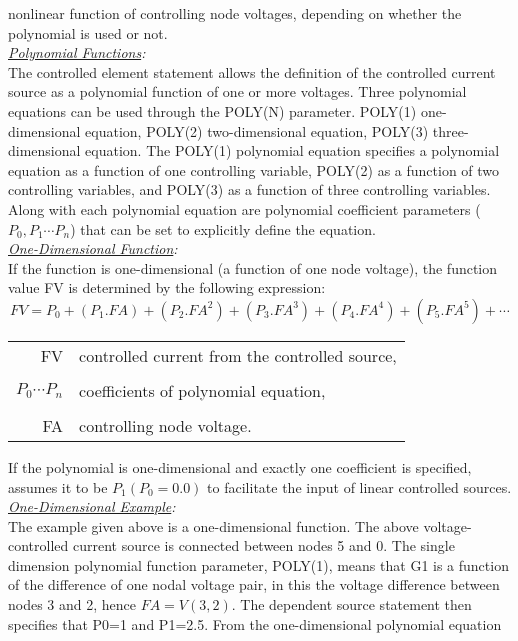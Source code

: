 \documentclass{article}
\begin{document}
nonlinear function of controlling node voltages, depending on
whether the polynomial is used or not.\\
\textit{\underline{Polynomial Functions}:}\\
The controlled element statement allows the definition of the
controlled current source as a polynomial function of one or more
voltages. Three polynomial equations can be used through the
POLY(N) parameter. POLY(1) one-dimensional equation, POLY(2)
two-dimensional equation, POLY(3) three-dimensional equation. The
POLY(1) polynomial equation specifies a polynomial equation as a
function of one controlling variable, POLY(2) as a function of two
controlling variables, and POLY(3) as a function of three
controlling variables. Along with each polynomial equation are
polynomial coefficient parameters ($P_0, P_1 \cdots P_n$) that can
be set to explicitly define the equation.\\
\textit{\underline{One-Dimensional Function}:}\\
If the function is one-dimensional (a function of one node
voltage), the function value FV is determined by the following
expression:
\begin{equation}
FV = P_0 + (P_1.FA) + (P_2.{FA}^2) + (P_3.{FA}^3)+ (P_4.{FA}^4) +
(P_5.{FA}^5) + \cdots
\end{equation}
\begin{tabular}{r l}
FV & controlled current from the controlled source, \\
&  \\
$P_0 \cdots P_n$ & coefficients of polynomial equation, \\
&  \\
FA & controlling node voltage.  \\
\end{tabular}
\newline
If the polynomial is one-dimensional and exactly one coefficient
is specified, \FDA assumes it to be $P_1 (P_0 = 0.0)$ to
facilitate the input of linear controlled sources.\\
\textit{\underline{One-Dimensional Example}:}\\
The example given above is a one-dimensional function. The above
voltage-controlled current source is connected between nodes 5 and
0. The single dimension polynomial function parameter, POLY(1),
means that G1 is a function of the difference of one nodal voltage
pair, in this the voltage difference between nodes 3 and 2, hence
$FA=V(3,2)$. The dependent source statement then specifies that
P0=1 and P1=2.5. From the one-dimensional polynomial equation
\end{document}

